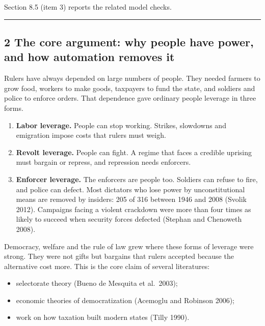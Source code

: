 \documentclass[
  10pt,
]{article}
\providecommand{\tightlist}{%
  \setlength{\itemsep}{0pt}\setlength{\parskip}{0pt}}
\begin{document}
Section 8.5 (item 3) reports the related model checks.

\begin{center}\rule{0.5\linewidth}{0.5pt}\end{center}

\subsection{2 The core argument: why people have power, and how automation removes
it}\label{the-core-argument-why-people-have-power-and-how-automation-removes-it}

Rulers have always depended on large numbers of people. They needed farmers to grow food, workers to
make goods, taxpayers to fund the state, and soldiers and police to enforce orders. That dependence
gave ordinary people leverage in three forms.

\begin{enumerate}
\def\labelenumi{\arabic{enumi}.}
\tightlist
\item
  \textbf{Labor leverage.} People can stop working. Strikes, slowdowns and emigration impose costs
  that rulers must weigh.
\item
  \textbf{Revolt leverage.} People can fight. A regime that faces a credible uprising must bargain
  or repress, and repression needs enforcers.
\item
  \textbf{Enforcer leverage.} The enforcers are people too. Soldiers can refuse to fire, and police
  can defect. Most dictators who lose power by unconstitutional means are removed by insiders: 205
  of 316 between 1946 and 2008 (Svolik 2012). Campaigns facing a violent crackdown were more than
  four times as likely to succeed when security forces defected (Stephan and Chenoweth 2008).
\end{enumerate}

Democracy, welfare and the rule of law grew where these forms of leverage were strong. They were not
gifts but bargains that rulers accepted because the alternative cost more. This is the core claim of
several literatures:

\begin{itemize}
\tightlist
\item
  selectorate theory (Bueno de Mesquita et al.~2003);
\item
  economic theories of democratization (Acemoglu and Robinson 2006);
\item
  work on how taxation built modern states (Tilly 1990).
\end{itemize}
\end{document}
